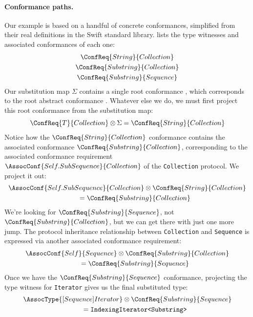\documentclass[../generics]{subfiles}
\begin{document}
\paragraph{Conformance paths.} Our example is based on a handful of concrete conformances, simplified from their real definitions in the Swift standard library.  lists the type witnesses and associated conformances of each one:
\begin{gather*}
\ConfReq{String}{Collection}\\
\ConfReq{Substring}{Collection}\\
\ConfReq{Substring}{Sequence}
\end{gather*}
Our substitution map $\Sigma$ contains a single root conformance , which corresponds to the root abstract conformance . Whatever else we do, we must first project this root conformance from the substitution map:
\[
\ConfReq{T}{Collection} \otimes \Sigma = \ConfReq{String}{Collection}
\]
Notice how the $\ConfReq{String}{Collection}$ conformance contains the associated conformance $\ConfReq{Substring}{Collection}$, corresponding to the associated conformance requirement $\AssocConf{Self.SubSequence}{Collection}$ of the \verb|Collection| protocol. We project it out:
\begin{gather*}
\AssocConf{Self.SubSequence}{Collection} \otimes \ConfReq{String}{Collection}\\
\qquad {} = \ConfReq{Substring}{Collection}
\end{gather*}
We're looking for $\ConfReq{Substring}{Sequence}$, not $\ConfReq{Substring}{Collection}$, but we can get there with just one more jump. The protocol inheritance relationship between \texttt{Collection} and \texttt{Sequence} is expressed via another associated conformance requirement:
\begin{gather*}
\AssocConf{Self}{Sequence} \otimes \ConfReq{Substring}{Collection}\\
\qquad {} = \ConfReq{Substring}{Sequence}
\end{gather*}
Once we have the $\ConfReq{Substring}{Sequence}$ conformance, projecting the type witness for \verb|Iterator| gives us the final substituted type:
\begin{gather*}
\AssocType{[Sequence]Iterator}\otimes \ConfReq{Substring}{Sequence}\\
\qquad {} = \texttt{IndexingIterator<Substring>}
\end{gather*}
\end{document}
